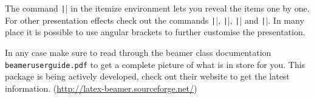 The command \texttt|\pause| in the itemize environment lets you reveal
the items one by one. For other presentation effects check out the
commands \texttt|\only|, \texttt|\uncover|, \texttt|\alt| and
\texttt|\temporal|. In many place it is possible to use angular brackets to
further customise the presentation.

In any case make sure to read through the beamer class documentation
\texttt{beameruserguide.pdf} to get a complete picture of what is in
store for you. This package is being actively developed, check out their website
to get the latest information. (\href{http://latex-beamer.sourceforge.net/}{http://latex-beamer.sourceforge.net/})

